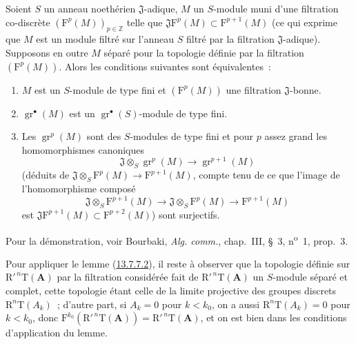 \begin{lemma}[13.7.7.2]
\label{0.13.7.7.2-fr}
Soient $S$ un anneau noethérien $\mathfrak J$-adique, $M$ un $S$-module muni
d'une filtration co-discrète $(\mathrm F^p(M))_{p\in\mathbb Z}$ telle que
$\mathfrak J\mathrm F^p(M)\subset\mathrm F^{p+1}(M)$ (ce qui exprime que
$M$ est un module filtré sur l'anneau $S$ filtré par la filtration
$\mathfrak J$-adique). Supposons en outre $M$ séparé pour la topologie définie
par la filtration $(\mathrm F^p(M))$. Alors les conditions suivantes sont
équivalentes~:
\begin{enumerate}
\item[\rm a)] $M$ est un $S$-module de type fini et $(\mathrm F^p(M))$ une
filtration $\mathfrak J$-bonne.
\item[\rm b)] $\operatorname{gr}^\bullet(M)$ est un
$\operatorname{gr}^\bullet(S)$-module de type fini.
\item[\rm c)] Les $\operatorname{gr}^p(M)$ sont des $S$-modules de type fini
et pour $p$ assez grand les homomorphismes canoniques
\begin{equation}
\label{0.13.7.7.3-fr}
\tag{13.7.7.3}
\mathfrak J\otimes_S\operatorname{gr}^p(M)\longrightarrow
\operatorname{gr}^{p+1}(M)
\end{equation}
(déduits de
$\mathfrak J\otimes_S\mathrm F^p(M)\to\mathrm F^{p+1}(M)$, compte tenu de ce
que l'image de l'homomorphisme composé
\[
\mathfrak J\otimes_S\mathrm F^{p+1}(M)\longrightarrow
\mathfrak J\otimes_S\mathrm F^p(M)\longrightarrow\mathrm F^{p+1}(M)
\]
est $\mathfrak J\mathrm F^{p+1}(M)\subset\mathrm F^{p+2}(M)$) sont
surjectifs.
\end{enumerate}
Pour la démonstration, voir Bourbaki, \emph{Alg. comm.}, chap.~III, \S~3,
n\textsuperscript{o}~1, prop.~3.
\end{lemma}

\begin{env}[13.7.7.4]
\label{0.13.7.7.4-fr}
Pour appliquer le lemme (\hyperref[0.13.7.7.2-fr]{13.7.7.2}), il reste à
observer que la topologie définie sur
$\mathrm R'^{\,n}\mathrm T(\mathbf A)$ par la filtration considérée fait de
$\mathrm R'^{\,n}\mathrm T(\mathbf A)$ un $S$-module séparé et complet,
cette topologie étant celle de la limite projective des groupes discrets
$\mathrm R^n\mathrm T(A_k)$~; d'autre part, si $A_k=0$ pour $k<k_0$, on a
aussi $\mathrm R^n\mathrm T(A_k)=0$ pour $k<k_0$, donc
$\mathrm F^{k_0}(\mathrm R'^{\,n}\mathrm T(\mathbf A))=
\mathrm R'^{\,n}\mathrm T(\mathbf A)$, et on est bien dans les conditions
d'application du lemme.
\end{env}

